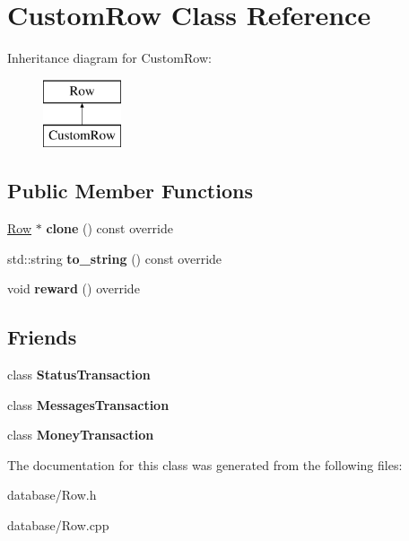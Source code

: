 \hypertarget{classCustomRow}{}\section{Custom\+Row Class Reference}
\label{classCustomRow}
Inheritance diagram for Custom\+Row\+:\begin{figure}[H]
\begin{center}
\leavevmode
\includegraphics[height=2.000000cm]{classCustomRow}
\end{center}
\end{figure}
\subsection*{Public Member Functions}
\begin{DoxyCompactItemize}
\item 
\mbox{\label{classCustomRow_a9d3c1b6bda5e63de382cc4a2aa29210d}} 
\mbox{\hyperlink{classRow}{Row}} $\ast$ {\bfseries clone} () const override
\item 
\mbox{\label{classCustomRow_ae1e5a3b861829f8b295d3c743d6b3c7a}} 
std\+::string {\bfseries to\+\_\+string} () const override
\item 
\mbox{\label{classCustomRow_a007002dc965ca2727ec8db0183404bf1}} 
void {\bfseries reward} () override
\end{DoxyCompactItemize}
\subsection*{Friends}
\begin{DoxyCompactItemize}
\item 
\mbox{\label{classCustomRow_a981e309965953ac0b11a1d0e611ff665}} 
class {\bfseries Status\+Transaction}
\item 
\mbox{\label{classCustomRow_aadda0b308cea8af7e493a972ceadc46d}} 
class {\bfseries Messages\+Transaction}
\item 
\mbox{\label{classCustomRow_aef619c16e7adc66eea065c1103177804}} 
class {\bfseries Money\+Transaction}
\end{DoxyCompactItemize}


The documentation for this class was generated from the following files\+:\begin{DoxyCompactItemize}
\item 
database/Row.\+h\item 
database/Row.\+cpp\end{DoxyCompactItemize}
